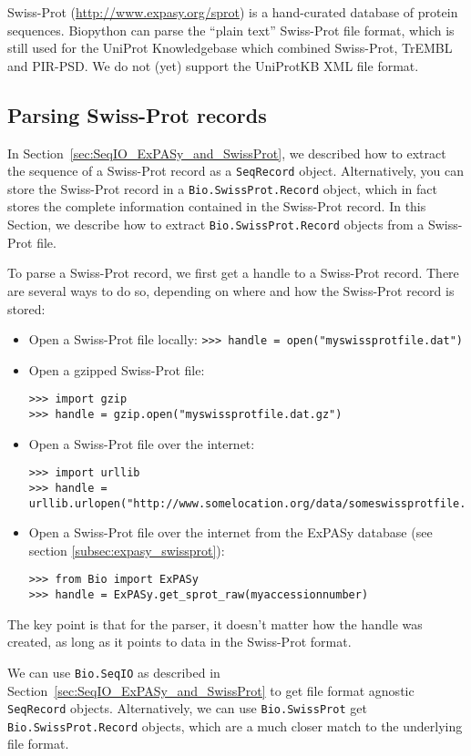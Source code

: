 \documentclass{report}
\begin{document}
Swiss-Prot (\url{http://www.expasy.org/sprot}) is a hand-curated database of protein sequences.  Biopython can parse the ``plain text'' Swiss-Prot file format, which is still used for the UniProt Knowledgebase which combined Swiss-Prot, TrEMBL and PIR-PSD.  We do not (yet) support the UniProtKB XML file format.

\subsection{Parsing Swiss-Prot records}

In Section~\ref{sec:SeqIO_ExPASy_and_SwissProt}, we described how to extract the sequence of a Swiss-Prot record as a \verb|SeqRecord| object. Alternatively, you can store the Swiss-Prot record in a \verb|Bio.SwissProt.Record| object, which in fact stores the complete information contained in the Swiss-Prot record. In this Section, we describe how to extract \verb|Bio.SwissProt.Record| objects from a Swiss-Prot file.

To parse a Swiss-Prot record, we first get a handle to a Swiss-Prot record. There are several ways to do so, depending on where and how the Swiss-Prot record is stored:
\begin{itemize}
\item Open a Swiss-Prot file locally: \newline
\verb|>>> handle = open("myswissprotfile.dat")|
\item Open a gzipped Swiss-Prot file:
\begin{verbatim}
>>> import gzip
>>> handle = gzip.open("myswissprotfile.dat.gz")
\end{verbatim}
\item Open a Swiss-Prot file over the internet:
\begin{verbatim}
>>> import urllib
>>> handle = urllib.urlopen("http://www.somelocation.org/data/someswissprotfile.dat")
\end{verbatim}
\item Open a Swiss-Prot file over the internet from the ExPASy database
(see section \ref{subsec:expasy_swissprot}):
\begin{verbatim}
>>> from Bio import ExPASy
>>> handle = ExPASy.get_sprot_raw(myaccessionnumber)
\end{verbatim}
\end{itemize}
The key point is that for the parser, it doesn't matter how the handle was created, as long as it points to data in the Swiss-Prot format.

We can use \verb+Bio.SeqIO+ as described in Section~\ref{sec:SeqIO_ExPASy_and_SwissProt} to get file format agnostic \verb|SeqRecord| objects.  Alternatively, we can use \verb+Bio.SwissProt+ get \verb|Bio.SwissProt.Record| objects, which are a much closer match to the underlying file format.
\end{document}
